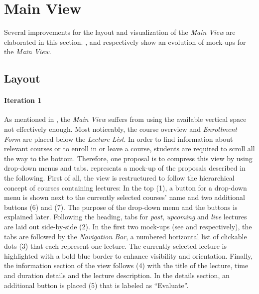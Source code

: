 \section{Main View}
Several improvements for the layout and visualization of the \emph{Main View} are elaborated in this section. ,  and  respectively show an evolution of mock-ups for the \emph{Main View}.
\subsection{Layout}
\label{section:con:proposals:mainview:layout}
\paragraph{Iteration 1}
As mentioned in , the \emph{Main View} suffers from using the available vertical space not effectively enough. Most noticeably, the course overview and \emph{Enrollment Form} are placed below the \emph{Lecture List}. In order to find information about relevant courses or to enroll in or leave a course, students are required to scroll all the way to the bottom. 
Therefore, one proposal is to compress this view by using drop-down menus and tabs.   represents a mock-up of the proposals described in the following. 
First of all, the view is restructured to follow the hierarchical concept of courses containing lectures: In the top (1), a button for a drop-down menu is shown next to the currently selected courses' name and two additional buttons (6) and (7). The purpose of the drop-down menu and the buttons is explained later.
Following the heading, tabs for \emph{past}, \emph{upcoming} and \emph{live} lectures are laid out side-by-side (2). In the first two mock-ups (see  and  respectively), the tabs are followed by the \emph{Navigation Bar}, a numbered horizontal list of clickable dots (3) that each represent one lecture. The currently selected lecture is highlighted with a bold blue border to enhance visibility and orientation. Finally, the information section of the view follows (4) with the title of the lecture, time and duration details and the lecture description. In the details section, an additional button is placed (5) that is labeled as “Evaluate”.
